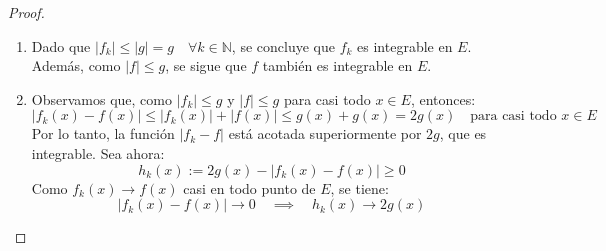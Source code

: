 \begin{proof}
    \leavevmode

    \begin{enumerate}
        \item Dado que \( |f_k| \leq |g| = g \quad \forall k \in \mathbb{N} \), se concluye
              que \( f_k \) es integrable en \( E \). Además, como \( |f| \leq g \), se sigue
              que \( f \) también es integrable en \( E \).
        \item Observamos que, como $|f_k| \leq g$ y $|f| \leq g$ para casi todo $x \in E$,
              entonces:
              \[
                  |f_k(x) - f(x)| \leq |f_k(x)| + |f(x)| \leq g(x) + g(x) = 2g(x)
                  \quad \text{para casi todo } x \in E
              \]
              Por lo tanto, la función $|f_k - f|$ está acotada superiormente por $2g$, que
              es integrable. Sea ahora:
              \[
                  h_k(x) := 2g(x) - |f_k(x) - f(x)| \geq 0
              \]
              Como $f_k(x) \to f(x)$ casi en todo punto de $E$, se tiene:
              \[
                  |f_k(x) - f(x)| \to 0 \quad \implies \quad h_k(x) \to 2g(x)
              \]


\end{enumerate}
\end{proof}
